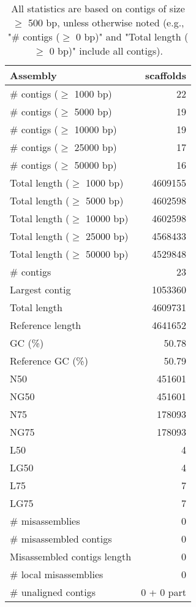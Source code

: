 \documentclass[12pt,a4paper]{article}
\begin{document}
\begin{table}[ht]
\begin{center}
\caption{All statistics are based on contigs of size $\geq$ 500 bp, unless otherwise noted (e.g., "\# contigs ($\geq$ 0 bp)" and "Total length ($\geq$ 0 bp)" include all contigs).}
\begin{tabular}{|l*{1}{|r}|}
\hline
Assembly & scaffolds \\ \hline
\# contigs ($\geq$ 1000 bp) & 22 \\ \hline
\# contigs ($\geq$ 5000 bp) & 19 \\ \hline
\# contigs ($\geq$ 10000 bp) & 19 \\ \hline
\# contigs ($\geq$ 25000 bp) & 17 \\ \hline
\# contigs ($\geq$ 50000 bp) & 16 \\ \hline
Total length ($\geq$ 1000 bp) & 4609155 \\ \hline
Total length ($\geq$ 5000 bp) & 4602598 \\ \hline
Total length ($\geq$ 10000 bp) & 4602598 \\ \hline
Total length ($\geq$ 25000 bp) & 4568433 \\ \hline
Total length ($\geq$ 50000 bp) & 4529848 \\ \hline
\# contigs & 23 \\ \hline
Largest contig & 1053360 \\ \hline
Total length & 4609731 \\ \hline
Reference length & 4641652 \\ \hline
GC (\%) & 50.78 \\ \hline
Reference GC (\%) & 50.79 \\ \hline
N50 & 451601 \\ \hline
NG50 & 451601 \\ \hline
N75 & 178093 \\ \hline
NG75 & 178093 \\ \hline
L50 & 4 \\ \hline
LG50 & 4 \\ \hline
L75 & 7 \\ \hline
LG75 & 7 \\ \hline
\# misassemblies & 0 \\ \hline
\# misassembled contigs & 0 \\ \hline
Misassembled contigs length & 0 \\ \hline
\# local misassemblies & 0 \\ \hline
\# unaligned contigs & 0 + 0 part \\ \hline

\end{tabular}
\end{center}
\end{table}
\end{document}
